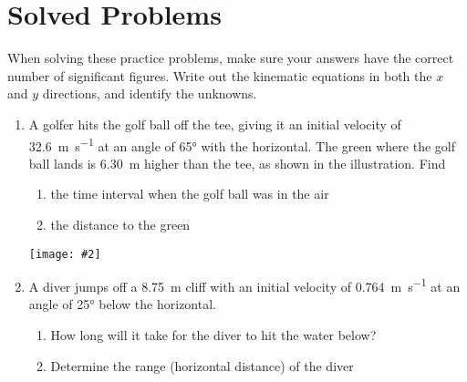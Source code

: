 \documentclass[11pt,titlepage,twoside]{article}
\newcommand{\pic}[2]{ \texttt{[image: \#2]} }
\begin{document}
\newpage

\section{Solved Problems}%

When solving these practice problems, make sure your answers have the correct
number of significant figures. Write out the kinematic equations in both the
$x$ and $y$ directions, and identify the unknowns.

\begin{enumerate}[
    label=\textbf{Example \arabic*:},
    itemindent=65pt,
    leftmargin=0pt]
  
\item A golfer hits the golf ball off the tee, giving it an initial velocity of
  \SI{32.6}{\metre\per\second} at an angle of \ang{65} with the horizontal. The
  green where the golf ball lands is \SI{6.30}{\metre} higher than the tee, as
  shown in the illustration. Find
  \begin{enumerate}
  \item the time interval when the golf ball was in the air
  \item the distance to the green
  \end{enumerate}
  \pic1{../graphics/golfer}
  \newpage
  
\item A diver jumps off a \SI{8.75}{\metre} cliff with an initial velocity of
  \SI{.764}{\metre\per\second} at an angle of \ang{25} below the horizontal.
  \begin{enumerate}
  \item How long will it take for the diver to hit the water below?
  \item Determine the range (horizontal distance) of the diver
  \end{enumerate}
  \newpage
  

\end{enumerate}
\end{document}
